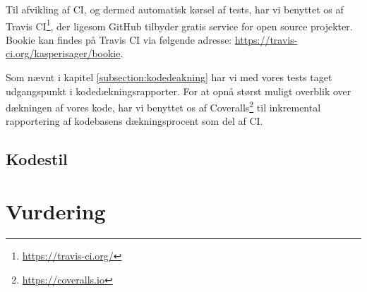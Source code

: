 Til afvikling af CI, og dermed automatisk kørsel af tests, har vi benyttet os af Travis CI\footnote{\url{https://travis-ci.org/}}, der ligesom GitHub tilbyder gratis service for open source projekter. Bookie kan findes på Travis CI via følgende adresse: \url{https://travis-ci.org/kasperisager/bookie}.

Som nævnt i kapitel \ref{subsection:kodedeakning} har vi med vores tests taget udgangspunkt i kodedækningsrapporter. For at opnå størst muligt overblik over dækningen af vores kode, har vi benyttet os af Coveralls\footnote{\url{https://coveralls.io}} til inkremental rapportering af kodebasens dækningsprocent som del af CI.

\subsection{Kodestil}

\section{Vurdering}